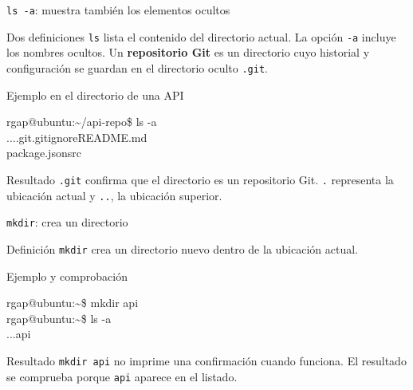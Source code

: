 \documentclass[aspectratio=169,10pt,c]{beamer}
\begin{document}
\begin{frame}{\texttt{ls -a}: muestra también los elementos ocultos}
\begin{block}{Dos definiciones}
\small \texttt{ls} lista el contenido del directorio actual. La opción \texttt{-a} incluye los nombres ocultos. Un \textbf{repositorio Git} es un directorio cuyo historial y configuración se guardan en el directorio oculto \texttt{.git}.
\end{block}
\begin{exampleblock}{Ejemplo en el directorio de una API}
\begin{terminal}
rgap@ubuntu:\textasciitilde/api-repo\$ ls -a\\
.\quad ..\quad .git\quad .gitignore\quad README.md\\
package.json\quad src
\end{terminal}
\end{exampleblock}
\begin{alertblock}{Resultado}
\small \texttt{.git} confirma que el directorio es un repositorio Git. \texttt{.} representa la ubicación actual y \texttt{..}, la ubicación superior.
\end{alertblock}
\end{frame}

\begin{frame}{\texttt{mkdir}: crea un directorio}
\begin{block}{Definición}
\large \texttt{mkdir} crea un directorio nuevo dentro de la ubicación actual.
\end{block}
\begin{exampleblock}{Ejemplo y comprobación}
\begin{terminal}
rgap@ubuntu:\textasciitilde\$ mkdir api\\
rgap@ubuntu:\textasciitilde\$ ls -a\\
.\quad ..\quad api
\end{terminal}
\end{exampleblock}
\begin{alertblock}{Resultado}
\small \texttt{mkdir api} no imprime una confirmación cuando funciona. El resultado se comprueba porque \texttt{api} aparece en el listado.
\end{alertblock}
\end{frame}
\end{document}
